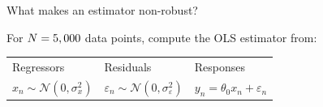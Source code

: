 




\begin{frame}{What makes an estimator non-robust?}

For $N=5,000$ data points, compute the OLS estimator from:

\vspace{1em}
\begin{tabularx}{\textwidth}{YYY}
    Regressors  &   Residuals   &   Responses \\
    $x_n \sim \mathcal{N}(0, \sigma_x^2)$   &
    $\varepsilon_n \sim \mathcal{N}(0, \sigma_\varepsilon^2)$   &
    $y_n = \theta_0 x_n + \varepsilon_n$
\end{tabularx}
%

\SimGridNormalGraph{}

\end{frame}





